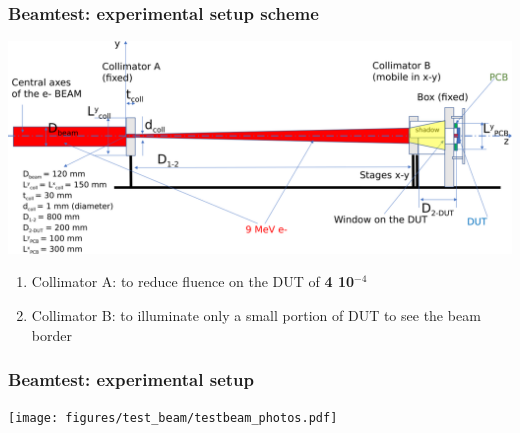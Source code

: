     \begin{frame}
        \frametitle{Beamtest: experimental setup scheme}
        \smallskip
        \includegraphics[width=.95\linewidth]{figures/test_beam/Flash-beam-scheme.pdf}\\
        \smallskip
        \begin{enumerate}
            \item Collimator A: to reduce fluence on the DUT of \textbf{4 10$^{-4}$}
            \item Collimator B: to illuminate only a small portion of DUT to see the beam border
        \end{enumerate}
        
    \end{frame}    


    \begin{frame}
        \frametitle{Beamtest: experimental setup}
        \centering
        \texttt{[image: figures/test\_beam/testbeam\_photos.pdf]}  
    \end{frame}    

